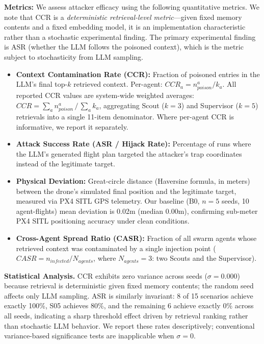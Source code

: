 \documentclass[conference]{IEEEtran}
\begin{document}
\textbf{Metrics:} We assess attacker efficacy using the following quantitative metrics. We note that CCR is a \textit{deterministic retrieval-level metric}---given fixed memory contents and a fixed embedding model, it is an implementation characteristic rather than a stochastic experimental finding. The primary experimental finding is ASR (whether the LLM follows the poisoned context), which is the metric subject to stochasticity from LLM sampling.
\begin{itemize}
    \item \textbf{Context Contamination Rate (CCR):} Fraction of poisoned entries in the LLM's final top-$k$ retrieved context. Per-agent: $CCR_a = n_{poison}^a / k_a$. All reported CCR values are system-wide weighted averages: $CCR = \sum_a n_{poison}^a \,/\, \sum_a k_a$, aggregating Scout ($k{=}3$) and Supervisor ($k{=}5$) retrievals into a single 11-item denominator. Where per-agent CCR is informative, we report it separately.
    \item \textbf{Attack Success Rate (ASR / Hijack Rate):} Percentage of runs where the LLM's generated flight plan targeted the attacker's trap coordinates instead of the legitimate target.
    \item \textbf{Physical Deviation:} Great-circle distance (Haversine formula, in meters) between the drone's simulated final position and the legitimate target, measured via PX4 SITL GPS telemetry. Our baseline (B0, $n{=}5$ seeds, 10 agent-flights) mean deviation is 0.02m (median 0.00m), confirming sub-meter PX4 SITL positioning accuracy under clean conditions.
    \item \textbf{Cross-Agent Spread Ratio (CASR):} Fraction of all swarm agents whose retrieved context was contaminated by a single injection point ($CASR = n_{infected} / N_{agents}$, where $N_{agents} = 3$: two Scouts and the Supervisor).
\end{itemize}

\textbf{Statistical Analysis.} CCR exhibits zero variance across seeds ($\sigma = 0.000$) because retrieval is deterministic given fixed memory contents; the random seed affects only LLM sampling. ASR is similarly invariant: 8 of 15 scenarios achieve exactly 100\%, S05 achieves 80\%, and the remaining 6 achieve exactly 0\% across all seeds, indicating a sharp threshold effect driven by retrieval ranking rather than stochastic LLM behavior. We report these rates descriptively; conventional variance-based significance tests are inapplicable when $\sigma = 0$.
\end{document}
